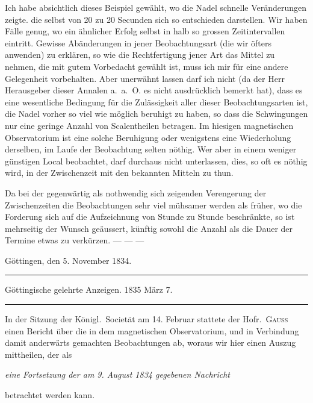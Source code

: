 Ich habe absichtlich dieses Beispiel gewählt, wo die Nadel schnelle Veränderungen zeigte. die selbst von 20 zu 20 Secunden sich so entschieden darstellen. Wir haben Fälle genug, wo ein ähnlicher Erfolg selbst in halb so grossen Zeitintervallen eintritt. Gewisse Abänderungen in jener Beobachtungsart (die wir öfters anwenden) zu erklären, so wie die Rechtfertigung jener Art das Mittel zu nehmen, die mit gutem Vorbedacht gewählt ist, muss ich mir für eine andere Gelegenheit vorbehalten. Aber unerwähnt lassen darf ich nicht (da der Herr Herausgeber dieser Annalen a.\ a.\ O. es nicht ausdrücklich bemerkt hat), dass es eine wesentliche Bedingung für die Zulässigkeit aller dieser Beobachtungsarten ist, die Nadel vorher so viel wie möglich beruhigt zu haben, so dass die Schwingungen nur eine geringe Anzahl von Scalentheilen betragen. Im hiesigen magnetischen Observatorium ist eine solche Beruhigung oder wenigstens eine Wiederholung derselben, im Laufe der Beobachtung selten nöthig. Wer aber in einem weniger günstigen Local beobachtet, darf durchaus nicht unterlassen, dies, so oft es nöthig wird, in der Zwischenzeit mit den bekannten Mitteln zu thun.

Da bei der gegenwärtig als nothwendig sich zeigenden Verengerung der Zwischenzeiten die Beobachtungen sehr viel mühsamer werden als früher, wo die Forderung sich auf die Aufzeichnung von Stunde zu Stunde beschränkte, so ist mehrseitig der Wunsch geäussert, künftig sowohl die Anzahl als die Dauer der Termine etwas zu verkürzen. — — —

Göttingen, den 5. November 1834.

\begin{samepage}
\bigskip
{}
\begin{center}
\hrule\vspace{2mm}
Göttingische gelehrte Anzeigen. 1835 März 7.
\vspace{2mm}\hrule\vspace{5mm}
\end{center}
In der Sitzung der Königl.\ Societät am 14. Februar stattete der Hofr.\ \textsc{Gauss} einen Bericht über die in dem magnetischen Observatorium, und in Verbindung damit anderwärts gemachten Beobachtungen ab, woraus wir hier einen Auszug mittheilen, der als
\begin{center}\itshape eine Fortsetzung der am 9. August 1834 gegebenen Nachricht\end{center}
\noindent betrachtet werden kann.
\end{samepage}

